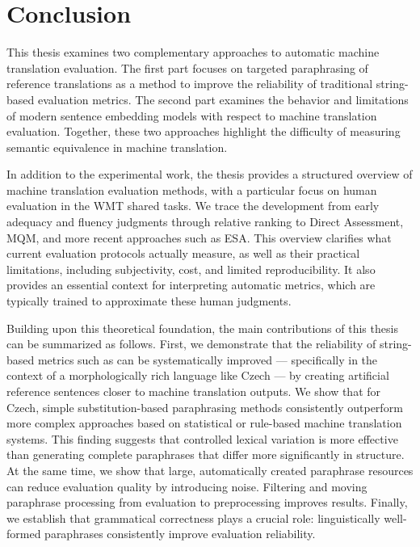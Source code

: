 \chapter*{Conclusion}

This thesis examines two complementary approaches to automatic machine translation evaluation. The first part focuses on targeted paraphrasing of reference translations as a method to improve the reliability of traditional string-based evaluation metrics. The second part examines the behavior and limitations of modern sentence embedding models with respect to machine translation evaluation. Together, these two approaches highlight the difficulty of measuring semantic equivalence in machine translation.

In addition to the experimental work, the thesis provides a structured overview of machine translation evaluation methods, with a particular focus on human evaluation in the WMT shared tasks. We trace the development from early adequacy and fluency judgments through relative ranking to Direct Assessment, MQM, and more recent approaches such as ESA. This overview clarifies what current evaluation protocols actually measure, as well as their practical limitations, including subjectivity, cost, and limited reproducibility. It also provides an essential context for interpreting automatic metrics, which are typically trained to approximate these human judgments.

Building upon this theoretical foundation, the main contributions of this thesis can be summarized as follows. First, we demonstrate that the reliability of string-based metrics such as \bleu can be systematically improved --- specifically in the context of a morphologically rich language like Czech --- by creating artificial reference sentences closer to machine translation outputs. We show that for Czech, simple substitution-based paraphrasing methods consistently outperform more complex approaches based on statistical or rule-based machine translation systems. This finding suggests that controlled lexical variation is more effective than generating complete paraphrases that differ more significantly in structure. At the same time, we show that large, automatically created paraphrase resources can reduce evaluation quality by introducing noise. Filtering and moving paraphrase processing from evaluation to preprocessing improves results. Finally, we establish that grammatical correctness plays a crucial role: linguistically well-formed paraphrases consistently improve evaluation reliability.

